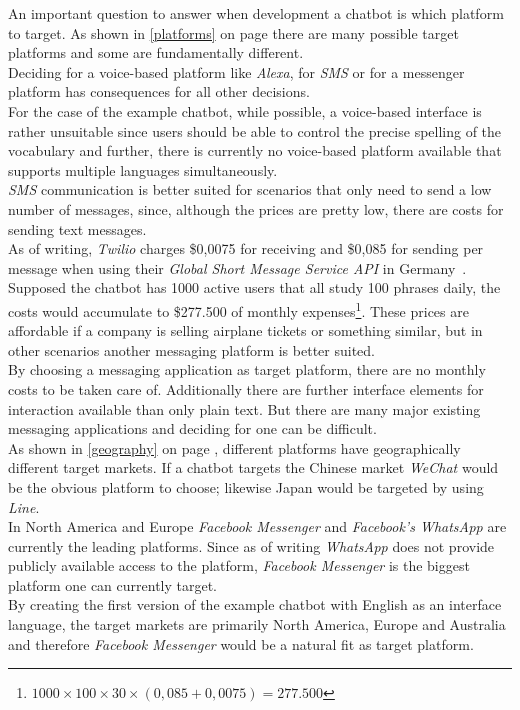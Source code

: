 An important question to answer when development a chatbot is which platform to target.
As shown in \ref{platforms} on page \pageref{platforms} there are many possible target platforms
and some are fundamentally different.
\\

Deciding for a voice-based platform like \emph{Alexa}, for \emph{SMS} or for a messenger platform has consequences
for all other decisions.
\\
For the case of the example chatbot, while possible, a voice-based interface is rather unsuitable since
users should be able to control the precise spelling of the vocabulary
and further, there is currently no voice-based platform available
that supports multiple languages simultaneously.
\\

\emph{SMS} communication is better suited for scenarios that only need to send a low number of messages,
since, although the prices are pretty low, there are costs for sending text messages.
\\
As of writing, \emph{Twilio} charges \$0,0075 for receiving and \$0,085 for sending per message when using their \emph{Global Short Message Service API} in Germany~\cite{twilio}.
\\
Supposed the chatbot has 1000 active users that all study 100 phrases daily,
the costs would accumulate to \$277.500 of monthly expenses\footnote{$1000\times100\times30\times(0,085+0,0075)=277.500$}.
These prices are affordable if a company is selling airplane tickets or something similar,
but in other scenarios another messaging platform is better suited.
\\

By choosing a messaging application as target platform, there are no monthly costs to be taken care of.
Additionally there are further interface elements for interaction available than only plain text.
But there are many major existing messaging applications and deciding for one can be difficult.
\\
As shown in \ref{geography} on page \pageref{geography}, different platforms have geographically different target markets.
If a chatbot targets the Chinese market \emph{WeChat} would be the obvious platform to choose;
likewise Japan would be targeted by using\emph{ Line}.
\\
In North America and Europe \emph{Facebook Messenger} and \emph{Facebook's WhatsApp} are currently the leading platforms.
Since as of writing \emph{WhatsApp} does not provide publicly available access to the platform,
\emph{Facebook Messenger} is the biggest platform one can currently target.
\\
By creating the first version of the example chatbot with English as an interface language,
the target markets are primarily North America, Europe and Australia and therefore \emph{Facebook Messenger} would be a natural fit as target platform.
\\

